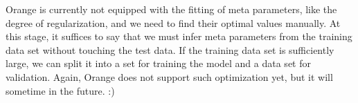 Orange is currently not equipped with the fitting of meta parameters, like the degree of regularization, and we need to find their optimal values manually. At this stage, it suffices to say that we must infer meta parameters from the training data set without touching the test data. If the training data set is sufficiently large, we can split it into a set for training the model and a data set for validation. Again, Orange does not support such optimization yet, but it will sometime in the future. :)